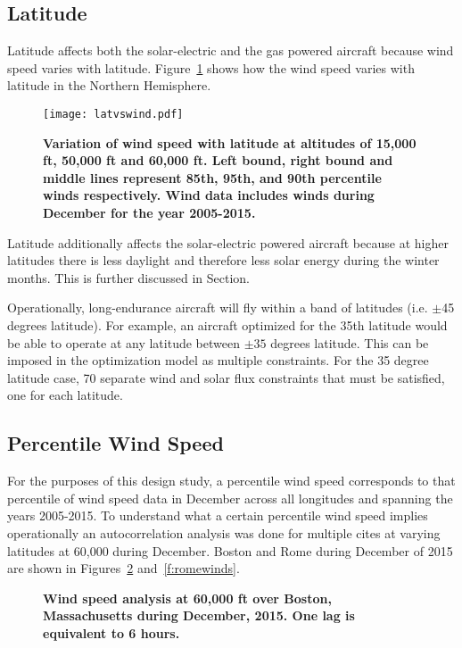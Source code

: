 \documentclass[]{aiaa-tc}%
\begin{document}
\subsection{Latitude}

Latitude affects both the solar-electric and the gas powered aircraft because wind speed varies with latitude. 
Figure~\ref{f:latvswind} shows how the wind speed varies with latitude in the Northern Hemisphere. 

\begin{figure}[H]
	\begin{center}
	\texttt{[image: latvswind.pdf]}
    \caption{\textbf{Variation of wind speed with latitude at altitudes of 15,000 ft, 50,000 ft and 60,000 ft.  Left bound, right bound and middle lines represent 85th, 95th, and 90th percentile winds respectively. Wind data includes winds during December for the year 2005-2015.}}
	\label{f:latvswind}
	\end{center}
\end{figure}

Latitude additionally affects the solar-electric powered aircraft because at higher latitudes there is less daylight and therefore less solar energy during the winter months. This is further discussed in Section.

Operationally, long-endurance aircraft will fly within a band of latitudes (i.e. $\pm$45 degrees latitude).  
For example, an aircraft optimized for the 35th latitude would be able to operate at any latitude between $\pm35$ degrees latitude. 
This can be imposed in the optimization model as multiple constraints. For the 35 degree latitude case, 70 separate wind and solar flux constraints that must be satisfied, one for each latitude.

\subsection{Percentile Wind Speed}

For the purposes of this design study, a percentile wind speed corresponds to that percentile of wind speed data in December across all longitudes and spanning the years 2005-2015.  
To understand what a certain percentile wind speed implies operationally an autocorrelation analysis was done for multiple cites at varying latitudes at 60,000 during December. 
Boston and Rome during December of 2015 are shown in Figures~\ref{f:bostonwinds} and~\ref{f:romewinds}. 

\begin{figure}[H]
 \begin{subfigmatrix}{2}%
 \end{subfigmatrix}
 \caption{\textbf{Wind speed analysis at 60,000 ft over Boston, Massachusetts during December, 2015. One lag is equivalent to 6 hours. }}
 \label{f:bostonwinds}
\end{figure}
\end{document}
